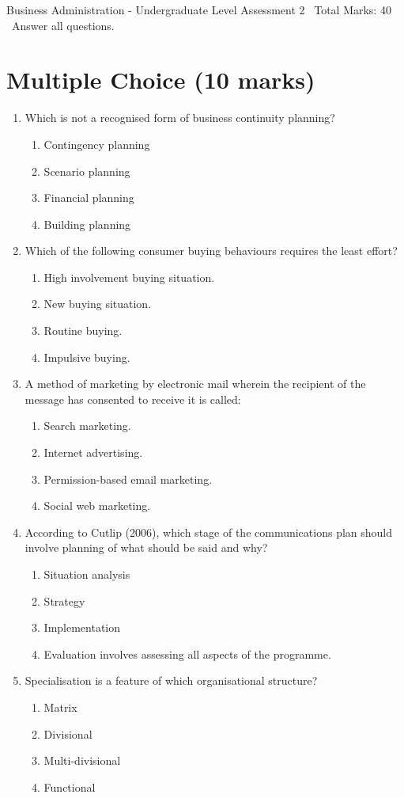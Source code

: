 \documentclass[12pt]{article}
\begin{document}
\begin{center}
Business Administration - Undergraduate Level Assessment 2 \
Total Marks: 40 \
Answer all questions.
\end{center}

\section*{Multiple Choice (10 marks)}
\begin{enumerate}[label=\arabic*.]
\item Which is not a recognised form of business continuity planning?
\begin{enumerate}[label=(\alph*)]
    \item Contingency planning
    \item Scenario planning
    \item Financial planning
    \item Building planning
\end{enumerate}
\item Which of the following consumer buying behaviours requires the least effort?
\begin{enumerate}[label=(\alph*)]
    \item High involvement buying situation.
    \item New buying situation.
    \item Routine buying.
    \item Impulsive buying.
\end{enumerate}
\item A method of marketing by electronic mail wherein the recipient of the message has consented to receive it is called:
\begin{enumerate}[label=(\alph*)]
    \item Search marketing.
    \item Internet advertising.
    \item Permission-based email marketing.
    \item Social web marketing.
\end{enumerate}
\item According to Cutlip (2006), which stage of the communications plan should involve planning of what should be said and why?
\begin{enumerate}[label=(\alph*)]
    \item Situation analysis
    \item Strategy
    \item Implementation
    \item Evaluation involves assessing all aspects of the programme.
\end{enumerate}
\item Specialisation is a feature of which organisational structure?
\begin{enumerate}[label=(\alph*)]
    \item Matrix
    \item Divisional
    \item Multi-divisional
    \item Functional
\end{enumerate}
\end{enumerate}
\end{document}
